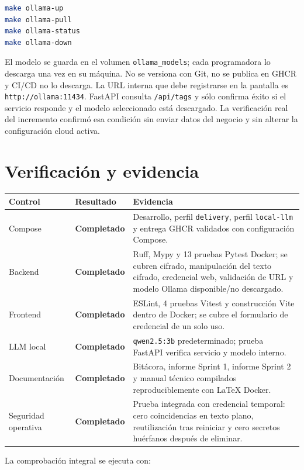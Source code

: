 \documentclass[11pt,letterpaper]{article}
\newcommand{\file}[1]{\texttt{#1}}
\newcommand{\statusok}{\textcolor{success}{\textbf{Completado}}}
\begin{document}
\begin{lstlisting}[style=terminal,language=bash]
make ollama-up
make ollama-pull
make ollama-status
make ollama-down
\end{lstlisting}

El modelo se guarda en el volumen \file{ollama\_models}; cada programadora lo descarga una vez en su máquina. No se versiona con Git, no se publica en GHCR y CI/CD no lo descarga. La URL interna que debe registrarse en la pantalla es \file{http://ollama:11434}. FastAPI consulta \file{/api/tags} y sólo confirma éxito si el servicio responde y el modelo seleccionado está descargado. La verificación real del incremento confirmó esa condición sin enviar datos del negocio y sin alterar la configuración cloud activa.

\section{Verificación y evidencia}

\begin{tabularx}{\textwidth}{@{}p{}p{}X@{}}
  \toprule
  Control & Resultado & Evidencia \\
  \midrule
  Compose & \statusok & Desarrollo, perfil \file{delivery}, perfil \file{local-llm} y entrega GHCR validados con configuración Compose. \\
  Backend & \statusok & Ruff, Mypy y 13 pruebas Pytest Docker; se cubren cifrado, manipulación del texto cifrado, credencial web, validación de URL y modelo Ollama disponible/no descargado. \\
  Frontend & \statusok & ESLint, 4 pruebas Vitest y construcción Vite dentro de Docker; se cubre el formulario de credencial de un solo uso. \\
  LLM local & \statusok & \file{qwen2.5:3b} predeterminado; prueba FastAPI verifica servicio y modelo interno. \\
  Documentación & \statusok & Bitácora, informe Sprint 1, informe Sprint 2 y manual técnico compilados reproduciblemente con LaTeX Docker. \\
  Seguridad operativa & \statusok & Prueba integrada con credencial temporal: cero coincidencias en texto plano, reutilización tras reiniciar y cero secretos huérfanos después de eliminar. \\
  \bottomrule
\end{tabularx}

La comprobación integral se ejecuta con:
\end{document}
